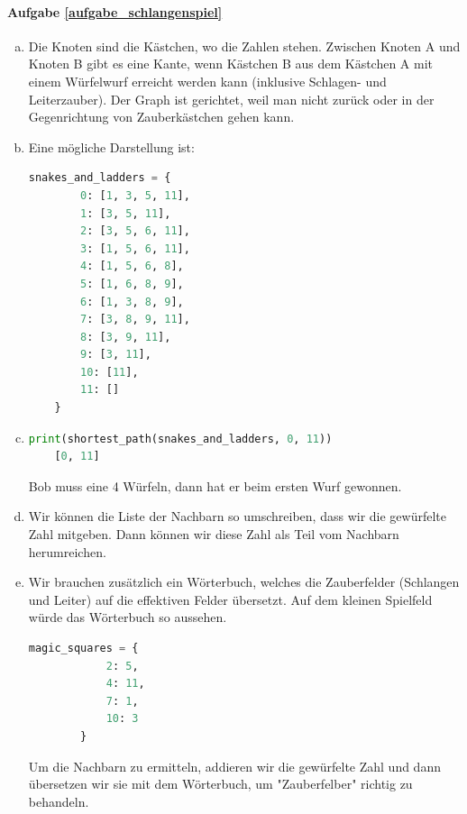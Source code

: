\paragraph{Aufgabe \ref{aufgabe_schlangenspiel}}
\begin{enumerate}[(a)]
    \item Die Knoten sind die Kästchen, wo die Zahlen stehen. Zwischen Knoten A und Knoten B gibt es eine Kante, wenn Kästchen B aus dem Kästchen A mit einem Würfelwurf erreicht werden kann (inklusive Schlagen- und Leiterzauber). Der Graph ist gerichtet, weil man nicht zurück oder in der Gegenrichtung von Zauberkästchen gehen kann.
    \item Eine mögliche Darstellung ist:
    \begin{lstlisting}[language=Python]
    snakes_and_ladders = {
        0: [1, 3, 5, 11],
        1: [3, 5, 11],
        2: [3, 5, 6, 11],
        3: [1, 5, 6, 11],
        4: [1, 5, 6, 8],
        5: [1, 6, 8, 9],
        6: [1, 3, 8, 9],
        7: [3, 8, 9, 11],
        8: [3, 9, 11],
        9: [3, 11],
        10: [11],
        11: []
    }
    \end{lstlisting}
    
    \item
    \begin{lstlisting}[language=Python]
    print(shortest_path(snakes_and_ladders, 0, 11))
    [0, 11]
    \end{lstlisting}
    Bob muss eine 4 Würfeln, dann hat er beim ersten Wurf gewonnen.
    
    \item Wir können die Liste der Nachbarn so umschreiben, dass wir die gewürfelte Zahl mitgeben. Dann können wir diese Zahl als Teil vom Nachbarn herumreichen.
    \item Wir brauchen zusätzlich ein Wörterbuch, welches die Zauberfelder (Schlangen und Leiter) auf die effektiven Felder übersetzt. Auf dem kleinen Spielfeld würde das Wörterbuch so aussehen.
    \begin{lstlisting}[language=Python]
        magic_squares = {
            2: 5,
            4: 11,
            7: 1,
            10: 3
        }
    \end{lstlisting}
    Um die Nachbarn zu ermitteln, addieren wir die gewürfelte Zahl und dann übersetzen wir sie mit dem Wörterbuch, um "Zauberfelber" richtig zu behandeln.
    

\end{enumerate}
